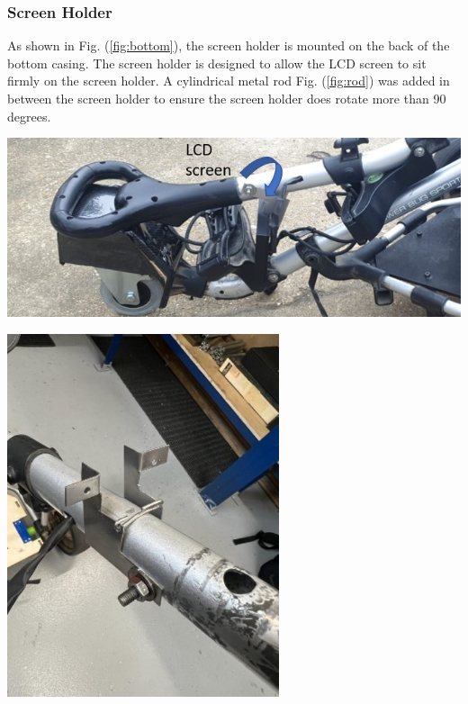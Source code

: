 \documentclass[11pt,landscape]{article}
\newenvironment{Figure}
  {\par\medskip\noindent\minipage{\linewidth}}
  {\endminipage\par\medskip}
\begin{document}
\begin{multicols}{3}
    \subsubsection{Screen Holder}
        As shown in Fig. (\ref{fig:bottom}), the screen holder is mounted on the back of the bottom casing. The screen holder is designed to allow the LCD
    screen to sit firmly on the screen holder. A
    cylindrical metal rod Fig. (\ref{fig:rod}) was added in between the
    screen holder to ensure the screen holder does rotate more than 90 degrees.

    
    \begin{Figure}
        \begin{center}
            \includegraphics[width=\textwidth]{Figure39.jpg}
            \label{fig:holder}
        \end{center}
    \end{Figure}
    
    \begin{Figure}
        \begin{center}
            \includegraphics[width=0.6\textwidth]{Figure31.jpg}
            \label{fig:rod}
        \end{center}
    \end{Figure}
    

\end{multicols}
\end{document}
